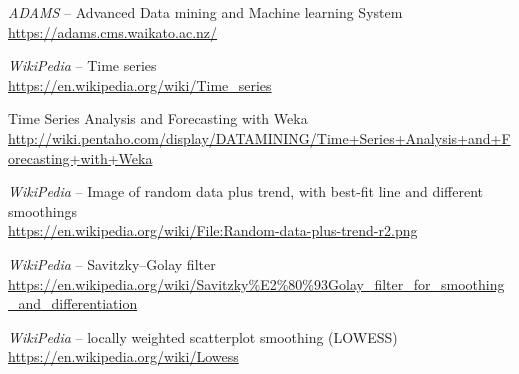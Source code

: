 %

\begin{thebibliography}{999}

		\textit{ADAMS} -- Advanced Data mining and Machine learning System \\
		\url{https://adams.cms.waikato.ac.nz/}{}
		
		\textit{WikiPedia} -- Time series \\
		\url{https://en.wikipedia.org/wiki/Time_series}{}
		
		Time Series Analysis and Forecasting with Weka \\
		\url{http://wiki.pentaho.com/display/DATAMINING/Time+Series+Analysis+and+Forecasting+with+Weka}{}
		
		\textit{WikiPedia} -- Image of random data plus trend, with best-fit line and different smoothings \\
		\url{https://en.wikipedia.org/wiki/File:Random-data-plus-trend-r2.png}{}
		
	    \textit{WikiPedia} -- Savitzky–Golay filter\\
	    \url{https://en.wikipedia.org/wiki/Savitzky\%E2\%80\%93Golay_filter_for_smoothing_and_differentiation}{}
	    
		\textit{WikiPedia} -- locally weighted scatterplot smoothing (LOWESS) \\
		\url{https://en.wikipedia.org/wiki/Lowess}{}

\end{thebibliography}
